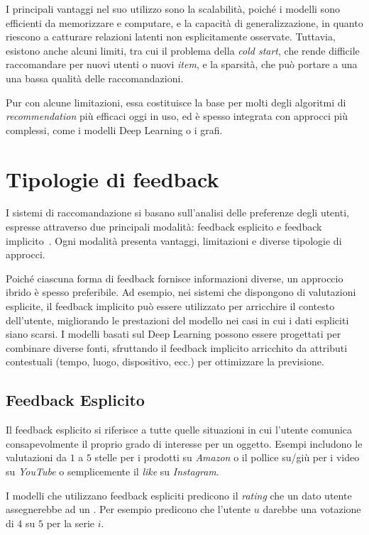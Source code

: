 I principali vantaggi nel suo utilizzo sono la scalabilità, poiché i modelli sono efficienti da memorizzare e computare, e la capacità di generalizzazione, in quanto riescono a catturare relazioni latenti non esplicitamente osservate. Tuttavia, esistono anche alcuni limiti, tra cui il problema della \textit{cold start}, che rende difficile raccomandare per nuovi utenti o nuovi \textit{item}, e la sparsità, che può portare a una una bassa qualità delle raccomandazioni\cite{SVD_analysis}.

Pur con alcune limitazioni, essa costituisce la base per molti degli algoritmi di \textit{recommendation} più efficaci oggi in uso, ed è spesso integrata con approcci più complessi, come i modelli Deep Learning o i grafi.

\section{Tipologie di feedback}

I sistemi di raccomandazione si basano sull'analisi delle preferenze degli utenti, espresse attraverso due principali modalità: feedback esplicito e feedback implicito~\cite{ALS}. Ogni modalità presenta vantaggi, limitazioni e diverse tipologie di approcci. 

Poiché ciascuna forma di feedback fornisce informazioni diverse, un approccio ibrido è spesso preferibile. Ad esempio, nei sistemi che dispongono di valutazioni esplicite, il feedback implicito può essere utilizzato per arricchire il contesto dell'utente, migliorando le prestazioni del modello nei casi in cui i dati espliciti siano scarsi. I modelli basati sul Deep Learning possono essere progettati per combinare diverse fonti, sfruttando il feedback implicito arricchito da attributi contestuali (tempo, luogo, dispositivo, ecc.) per ottimizzare la previsione.

\subsection{Feedback Esplicito}

Il feedback esplicito si riferisce a tutte quelle situazioni in cui l'utente comunica consapevolmente il proprio grado di interesse per un oggetto. Esempi includono le valutazioni da $1$ a $5$ stelle per i prodotti su \textit{Amazon} o il pollice su/giù per i video su \textit{YouTube} o semplicemente il \textit{like} su \textit{Instagram}.

I modelli che utilizzano feedback espliciti predicono il \textit{rating} che un dato utente assegnerebbe ad un . Per esempio predicono che l'utente $u$ darebbe una votazione di $4$ su $5$ per la serie $i$.

